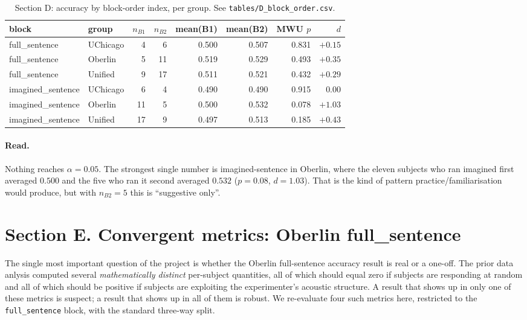 \documentclass[11pt]{article}
\begin{document}
\begin{table}[h]
\centering
\small
\begin{tabular}{llrrrrrr}
\toprule
block & group & $n_{B1}$ & $n_{B2}$ & mean(B1) & mean(B2) & MWU $p$ & $d$ \\
\midrule
full\_sentence     & UChicago &  4 &  6 & 0.500 & 0.507 & 0.831 & $+0.15$ \\
full\_sentence     & Oberlin  &  5 & 11 & 0.519 & 0.529 & 0.493 & $+0.35$ \\
full\_sentence     & Unified  &  9 & 17 & 0.511 & 0.521 & 0.432 & $+0.29$ \\
imagined\_sentence & UChicago &  6 &  4 & 0.490 & 0.490 & 0.915 & $0.00$ \\
imagined\_sentence & Oberlin  & 11 &  5 & 0.500 & 0.532 & 0.078 & $+1.03$ \\
imagined\_sentence & Unified  & 17 &  9 & 0.497 & 0.513 & 0.185 & $+0.43$ \\
\bottomrule
\end{tabular}
\caption{Section D: accuracy by block-order index, per group.  See
\texttt{tables/D\_block\_order.csv}.}
\end{table}

\paragraph{Read.}
Nothing reaches $\alpha=0.05$.  The strongest single number is
imagined-sentence in Oberlin, where the eleven subjects who ran
imagined first averaged $0.500$ and the five who ran it second
averaged $0.532$ ($p=0.08$, $d=1.03$).  That is the kind of pattern
practice/familiarisation would produce, but with $n_{B2}=5$ this is ``suggestive only''.

\section{Section E.  Convergent metrics: Oberlin full\_sentence}

The single most important question of the project is whether the
Oberlin full-sentence accuracy result is real or a one-off. The
prior data anlysis computed several
\emph{mathematically distinct} per-subject quantities, all of which
should equal zero if subjects are responding at random and all of
which should be positive if subjects are exploiting the experimenter's
acoustic structure.  A result that shows up in only one of these
metrics is suspect; a result that shows up in all of them is robust.
We re-evaluate four such metrics here, restricted to the
\texttt{full\_sentence} block, with the standard three-way split.
\end{document}
